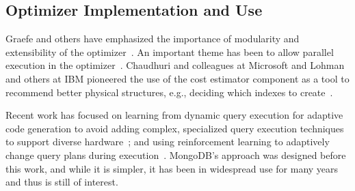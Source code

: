 
\subsection{Optimizer Implementation and Use}
Graefe and others have emphasized the importance of modularity and extensibility of the optimizer~\cite{Graefe94, Graefe95a}. An important theme has been to allow parallel execution in the optimizer~\cite{WaasH09, SolimanAREGSCGRPWNKB14}. 
Chaudhuri and colleagues at Microsoft and Lohman and others at IBM pioneered the use of the cost estimator component as a tool to recommend better physical structures, e.g., deciding which indexes to create~\cite{Chaudhuri:1998478, Chaudhuri:20049cd, Valentin:20005d5, Agrawal:2005dff, chaudhuri2008pay}.

Recent work has focused on learning from dynamic query execution for adaptive code generation to avoid adding complex, specialized query execution techniques to support diverse hardware~\cite{Gubner22}; and using reinforcement learning to adaptively change query plans during execution~\cite{Trummer21}. MongoDB's \approachName approach was designed before this work, and while it is simpler, it has been in widespread use for many years and thus is still of interest.

